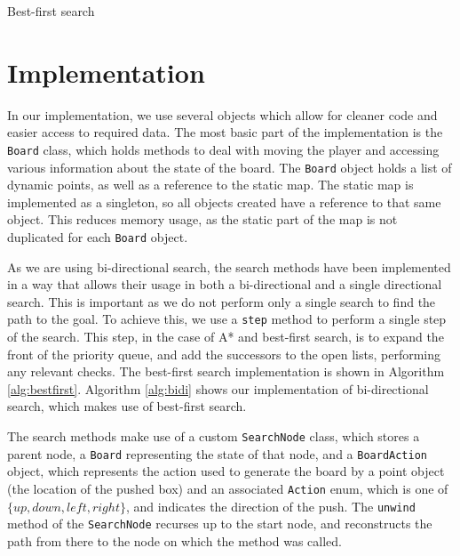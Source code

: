 \documentclass[a4paper,11pt]{article}
\begin{document}
\begin{algorithm}
  \DontPrintSemicolon
\caption{Best-first search}
\label{alg:bestfirst}
\end{algorithm}

\section{Implementation}
In our implementation, we use several objects which allow for cleaner code and
easier access to required data. The most basic part of the implementation is the
\texttt{Board} class, which holds methods to deal with moving the player and
accessing various information about the state of the board. The \texttt{Board}
object holds a list of dynamic points, as well as a reference to the static
map. The static map is implemented as a singleton, so all objects created have a
reference to that same object. This reduces memory usage, as the static part of
the map is not duplicated for each \texttt{Board} object.

As we are using bi-directional search, the search methods have been implemented
in a way that allows their usage in both a bi-directional and a single
directional search. This is important as we do not perform only a single search
to find the path to the goal. To achieve this, we use a \texttt{step} method to
perform a single step of the search. This step, in the case of A* and best-first
search, is to expand the front of the priority queue, and add the successors to
the open lists, performing any relevant checks. The best-first search
implementation is shown in Algorithm \ref{alg:bestfirst}. Algorithm
\ref{alg:bidi} shows our implementation of bi-directional search, which makes
use of best-first search.

The search methods make use of a custom \texttt{SearchNode} class, which stores
a parent node, a \texttt{Board} representing the state of that node, and a
\texttt{BoardAction} object, which represents the action used to generate the
board by a point object (the location of the pushed box) and an associated
\texttt{Action} enum, which is one of $\{up, down, left, right\}$, and indicates
the direction of the push. The \texttt{unwind} method of the \texttt{SearchNode}
recurses up to the start node, and reconstructs the path from there to the node
on which the method was called.
\end{document}

